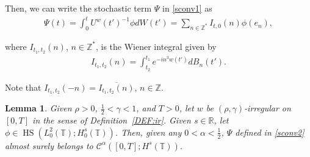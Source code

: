 \documentclass[letterpaper, 11pt,  reqno]{amsart}
\newtheorem{lemma}[theorem]{Lemma}
\DeclareMathOperator{\HS}{HS}
\newcommand{\1}{\hspace{0.5mm}\text{I}\hspace{0.5mm}}
\newcommand{\noi}{\noindent}
\newcommand{\Z}{\mathbb{Z}}
\newcommand{\R}{\mathbb{R}}
\newcommand{\T}{\mathbb{T}}
\newcommand{\CC}{\mathcal{C}}
\newcommand{\al}{\alpha}
\newcommand{\g}{\gamma}
\newcommand{\cj}{\overline}
\newcommand{\uw}{U^w}
\numberwithin{equation}{section}
\numberwithin{theorem}{section}
\begin{document}
\noi
Then, we can write the stochastic term $\Psi$ in \eqref{sconv1}
as 
\begin{align}
\Psi(t) = \int_0^t \uw(t')^{-1}\phi dW(t')
=   \sum_{n \in \Z^*} I_{t, 0}(n) \phi (e_n), 
\label{sconv2}
\end{align}

\noi
where $I_{t_1, t_2}(n)$, $ n \in \Z^*$,  is the Wiener integral given by 
\begin{align}
I_{t_1, t_2}(n)=  \int_{t_2}^{t_1} 
e^{-i n^3 w(t')}
dB_n (t') .
\label{sconv3}
\end{align}

\noi
Note that $I_{t_1, t_2}(-n) = \cj{I_{t_1, t_2}(n)}$, $n \in \Z$.

\begin{lemma}\label{LEM:sto1}
Given $\rho >0$,  $\frac 12 < \g < 1$, and $T> 0$, 
let  $w$ be $(\rho,\g)$-irregular on $[0, T]$ in the sense of Definition~\ref{DEF:ir}.
Given $s \in \R$, 
let $\phi \in \HS(L^2_0(\T); H^s_0(\T))$.
Then, 
given any $0<  \al < \frac 12$, 
$\Psi$ defined in \eqref{sconv2}
almost surely belongs to 
 $ \CC^\al([0, T]; H^s(\T))$.



\end{lemma}
\end{document}
